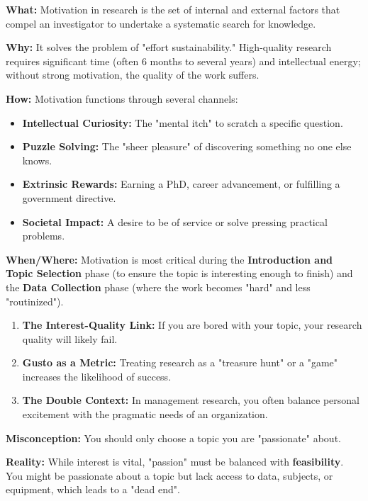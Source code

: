 \documentclass{report}
\begin{document}
\begin{layerReal}
    \textbf{What:} Motivation in research is the set of internal and external factors that compel an investigator to undertake a systematic search for knowledge. 
    
    
    \textbf{Why:} It solves the problem of "effort sustainability." High-quality research requires significant time (often 6 months to several years) and intellectual energy; without strong motivation, the quality of the work suffers.
    
    
    \textbf{How:} Motivation functions through several channels:
    \begin{itemize}
        \item \textbf{Intellectual Curiosity:} The "mental itch" to scratch a specific question.
        \item \textbf{Puzzle Solving:} The "sheer pleasure" of discovering something no one else knows.
        \item \textbf{Extrinsic Rewards:} Earning a PhD, career advancement, or fulfilling a government directive.
        \item \textbf{Societal Impact:} A desire to be of service or solve pressing practical problems.
    \end{itemize}
    
    
    \textbf{When/Where:} Motivation is most critical during the \textbf{Introduction and Topic Selection} phase (to ensure the topic is interesting enough to finish) and the \textbf{Data Collection} phase (where the work becomes "hard" and less "routinized").
\end{layerReal}

\begin{layerTakeaways}
    \begin{enumerate}
        \item \textbf{The Interest-Quality Link:} If you are bored with your topic, your research quality will likely fail.
        \item \textbf{Gusto as a Metric:} Treating research as a "treasure hunt" or a "game" increases the likelihood of success.
        \item \textbf{The Double Context:} In management research, you often balance personal excitement with the pragmatic needs of an organization.
    \end{enumerate}
\end{layerTakeaways}

\begin{misconception}
    \textbf{Misconception:} You should only choose a topic you are "passionate" about.
    
    
    \textbf{Reality:} While interest is vital, "passion" must be balanced with \textbf{feasibility}. You might be passionate about a topic but lack access to data, subjects, or equipment, which leads to a "dead end".
\end{misconception}
\end{document}
